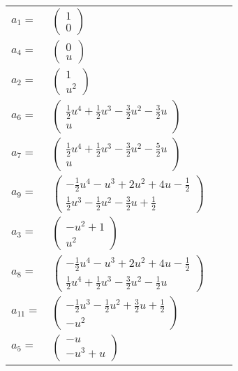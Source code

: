\documentclass[1p]{elsarticle_modified}
\theoremstyle{definition}
\begin{document}
\begin{tabular}{m{7pt} m{180pt} m{7pt} m{180pt} }
\flushright $a_{1}=$&$\begin{pmatrix}1\\0\end{pmatrix}$ \\
\flushright $a_{4}=$&$\begin{pmatrix}0\\u\end{pmatrix}$ \\
\flushright $a_{2}=$&$\begin{pmatrix}1\\u^2\end{pmatrix}$ \\
\flushright $a_{6}=$&$\begin{pmatrix}\frac{1}{2} u^4+\frac{1}{2} u^3-\frac{3}{2} u^2-\frac{3}{2} u\\u\end{pmatrix}$ \\
\flushright $a_{7}=$&$\begin{pmatrix}\frac{1}{2} u^4+\frac{1}{2} u^3-\frac{3}{2} u^2-\frac{5}{2} u\\u\end{pmatrix}$ \\
\flushright $a_{9}=$&$\begin{pmatrix}-\frac{1}{2} u^4- u^3+2 u^2+4 u-\frac{1}{2}\\\frac{1}{2} u^3-\frac{1}{2} u^2-\frac{3}{2} u+\frac{1}{2}\end{pmatrix}$ \\
\flushright $a_{3}=$&$\begin{pmatrix}- u^2+1\\u^2\end{pmatrix}$ \\
\flushright $a_{8}=$&$\begin{pmatrix}-\frac{1}{2} u^4- u^3+2 u^2+4 u-\frac{1}{2}\\\frac{1}{2} u^4+\frac{1}{2} u^3-\frac{3}{2} u^2-\frac{1}{2} u\end{pmatrix}$ \\
\flushright $a_{11}=$&$\begin{pmatrix}-\frac{1}{2} u^3-\frac{1}{2} u^2+\frac{3}{2} u+\frac{1}{2}\\- u^2\end{pmatrix}$ \\
\flushright $a_{5}=$&$\begin{pmatrix}- u\\- u^3+u\end{pmatrix}$ \\

\end{tabular}
\end{document}
